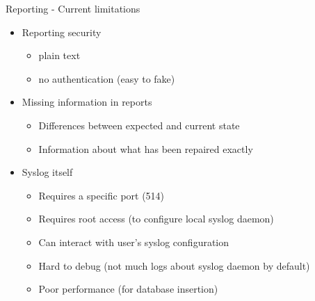 \documentclass[aspectratio=169, 14pt]{beamer}
\begin{document}
\begin{frame}{Reporting - Current limitations}
	\begin{itemize}
		\item Reporting security
		      \begin{itemize}
			      \item plain text
			      \item no authentication (easy to fake)
		      \end{itemize}
		\item Missing information in reports
		      \begin{itemize}
			      \item Differences between expected and current state
			      \item Information about what has been repaired exactly
		      \end{itemize}
		\item Syslog itself
		      \begin{itemize}
			      \item Requires a specific port (514)
			      \item Requires root access (to configure local syslog daemon)
			      \item Can interact with user's syslog configuration
			      \item Hard to debug (not much logs about syslog daemon by default)
			      \item Poor performance (for database insertion)
		      \end{itemize}
	\end{itemize}
\end{frame}
\end{document}
